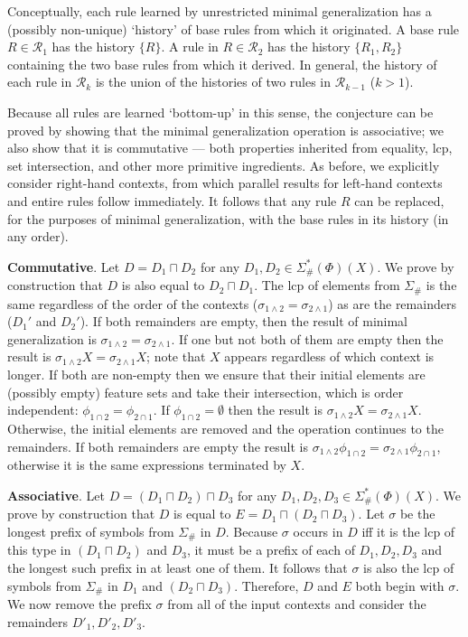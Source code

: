 \documentclass[11pt]{article}
\begin{document}
Conceptually, each rule learned by unrestricted minimal generalization has a (possibly non-unique) `history' of base rules from which it originated. A base rule $R \in \mathcal{R}_1$ has the history $\{ R \}$. A rule in $R \in \mathcal{R}_2$ has the history $\{ R_1, R_2 \}$ containing the two base rules from which it derived. In general, the history of each rule in $\mathcal{R}_k$ is the union of the histories of two rules in $\mathcal{R}_{k-1}$ ($k > 1$).

Because all rules are learned `bottom-up' in this sense, the conjecture can be proved by showing that the minimal generalization operation is associative; we also show that it is commutative --- both properties inherited from equality, lcp, set intersection, and other more primitive ingredients. As before, we explicitly consider right-hand contexts, from which parallel results for left-hand contexts and entire rules follow immediately. It follows that any rule $R$ can be replaced, for the purposes of minimal generalization, with the base rules in its history (in any order). 

\textbf{Commutative}. Let $D = D_1 \sqcap D_2$ for any $D_1, D_2 \in \Sigma_{\#}^*(\Phi)(X)$. We prove by construction that $D$ is also equal to $D_2 \sqcap D_1$. The lcp of elements from $\Sigma_{\#}$ is the same regardless of the order of the contexts ($\sigma_{1\land 2} = \sigma_{2\land 1}$) as are the remainders ($D_1'$ and $D_2'$). If both remainders are empty, then the result of minimal generalization is $\sigma_{1\land 2} = \sigma_{2\land 1}$. If one but not both of them are empty then the result is $\sigma_{1\land 2}X = \sigma_{2\land 1}X$; note that $X$ appears regardless of which context is longer. If both are non-empty then we ensure that their initial elements are (possibly empty) feature sets and take their intersection, which is order independent: $\phi_{1\cap 2} = \phi_{2\cap 1}$. If $\phi_{1\cap 2} = \emptyset$ then the result is $\sigma_{1\land 2}X = \sigma_{2\land 1}X$. Otherwise, the initial elements are removed and the operation continues to the remainders. If both remainders are empty the result is $\sigma_{1\land 2}\phi_{1\cap 2} = \sigma_{2\land 1}\phi_{2\cap 1}$, otherwise it is the same expressions terminated by $X$.

\textbf{Associative}. Let $D = (D_1 \sqcap D_2) \sqcap D_3$ for any $D_1, D_2, D_3 \in \Sigma_{\#}^*(\Phi)(X)$. We prove by construction that $D$ is equal to $E = D_1 \sqcap (D_2 \sqcap D_3)$. Let $\sigma$ be the longest prefix of symbols from $\Sigma_{\#}$ in $D$. Because $\sigma$ occurs in $D$ iff it is the lcp of this type in $(D_1 \sqcap D_2)$ and $D_3$, it must be a prefix of each of $D_1, D_2, D_3$ and the longest such prefix in at least one of them. It follows that $\sigma$ is also the lcp of symbols from $\Sigma_{\#}$ in $D_1$ and $(D_2 \sqcap D_3)$. Therefore, $D$ and $E$ both begin with $\sigma$. We now remove the prefix $\sigma$ from all of the input contexts and consider the remainders $D'_1, D'_2, D'_3$.
\end{document}
